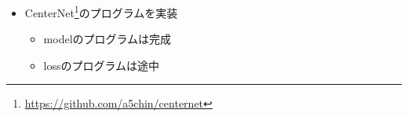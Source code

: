 \documentclass[a4j]{ujarticle}
\newcommand{\Tref}[1]{\mbox{表\ref{tab:#1}}}
\begin{document}
\begin{itemize}
            \begin{itemize}
                \item \Tref{metric_center_flex}から(\Tref{metric_center}と比べて)
                \begin{itemize}
                    \item 全体的に30\% 程精度が低くなっている
                    \item 特にHCCは40\% 程精度が低くなっている
                \end{itemize}
            \end{itemize}
            \begin{itemize}
                \item 考察
                \begin{itemize}
                    \item 事前に対照学習をした効果が十分に得られていないので下流層から上流層に向けて段階的に重みの固定を解除していくのが良さそうなのではないか
                    \begin{itemize}
                        \item 現在学習途中
                        \item 決まったepoch数学習するのではなくmAPの上昇が止まったところで次層の固定を解除することも試してみたい
                    \end{itemize}
                    \item 検出と分類のheadを分けて実験したらどうなるのか気になる
                    \begin{itemize}
                        \item 固定した重みが検出と分類を同時にするには有効ではない可能性があったから
                        \item 今後のためにもCenterNet\cite{centernet}のプログラムを実装していく
                    \end{itemize}
                \end{itemize}
            \end{itemize}
            \item CenterNet\cite{centernet}\footnote{\url{https://github.com/a5chin/centernet}}のプログラムを実装
            \begin{itemize}
                \item modelのプログラムは完成
                \item lossのプログラムは途中
            \end{itemize}
        \end{itemize}
\end{document}
